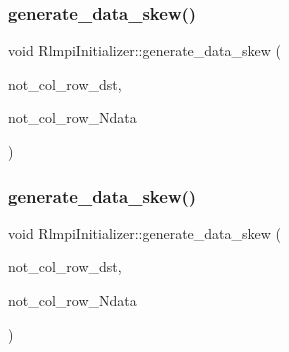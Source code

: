 \subsubsection{\texorpdfstring{generate\_data\_skew()}{generate\_data\_skew()}\hspace{0.1cm}{\footnotesize\ttfamily [3/4]}}
{\footnotesize\ttfamily void Rlmpi\+Initializer\+::generate\+\_\+data\+\_\+skew (\begin{DoxyParamCaption}\item[{const vector$<$ vector$<$ \mbox{\hyperlink{include_2RlmpiShared_8h_a69782ffde89d45e86308f10afedf08a6}{int8\+L\+DM}} $>$ $>$ \&}]{not\+\_\+col\+\_\+row\+\_\+dst,  }\item[{const vector$<$ vector$<$ \mbox{\hyperlink{include_2RlmpiShared_8h_a69782ffde89d45e86308f10afedf08a6}{int8\+L\+DM}} $>$ $>$ \&}]{not\+\_\+col\+\_\+row\+\_\+\+Ndata }\end{DoxyParamCaption})\hspace{0.3cm}{\ttfamily [protected]}}

\mbox{\label{classRlmpiInitializer_ab02ee7a3cbda15a39f3e2e7218c92cc2}} 
\subsubsection{\texorpdfstring{generate\_data\_skew()}{generate\_data\_skew()}\hspace{0.1cm}{\footnotesize\ttfamily [4/4]}}
{\footnotesize\ttfamily void Rlmpi\+Initializer\+::generate\+\_\+data\+\_\+skew (\begin{DoxyParamCaption}\item[{const vector$<$ vector$<$ \mbox{\hyperlink{include_2RlmpiShared_8h_a69782ffde89d45e86308f10afedf08a6}{int8\+L\+DM}} $>$ $>$ \&}]{not\+\_\+col\+\_\+row\+\_\+dst,  }\item[{const vector$<$ vector$<$ \mbox{\hyperlink{include_2RlmpiShared_8h_a69782ffde89d45e86308f10afedf08a6}{int8\+L\+DM}} $>$ $>$ \&}]{not\+\_\+col\+\_\+row\+\_\+\+Ndata }\end{DoxyParamCaption})\hspace{0.3cm}{\ttfamily [protected]}}

\mbox{\label{classRlmpiInitializer_a50e9169843eaa848e5bff8ec3859a990}} 
